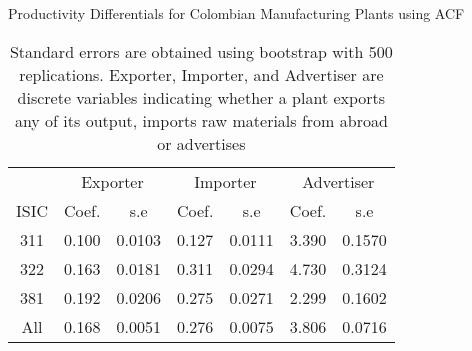 \documentclass[11pt]{article}
\begin{document}
\begin{table}[H]
\centering
\caption{Productivity Differentials for Colombian Manufacturing Plants using ACF}
\begin{tabular}{ccccccc}
  \hline\hline & \multicolumn{2}{c}{Exporter}  & \multicolumn{2}{c}{Importer} & \multicolumn{2}{c}{Advertiser} \\ \cmidrule(lr){2-3} \cmidrule(lr){4-5} \cmidrule(lr){6-7}ISIC & Coef. & s.e & Coef. & s.e & Coef. & s.e \\ 
  \hline
311 & 0.100 & 0.0103 & 0.127 & 0.0111 & 3.390 & 0.1570 \\ 
  322 & 0.163 & 0.0181 & 0.311 & 0.0294 & 4.730 & 0.3124 \\ 
  381 & 0.192 & 0.0206 & 0.275 & 0.0271 & 2.299 & 0.1602 \\ 
  All & 0.168 & 0.0051 & 0.276 & 0.0075 & 3.806 & 0.0716 \\ 
   \hline
\end{tabular}
\caption*{Standard errors are obtained using bootstrap with 500 replications. Exporter, Importer, and Advertiser are discrete variables indicating whether a plant exports any of its output, imports raw materials from abroad or advertises}
\end{table}
\end{document}

